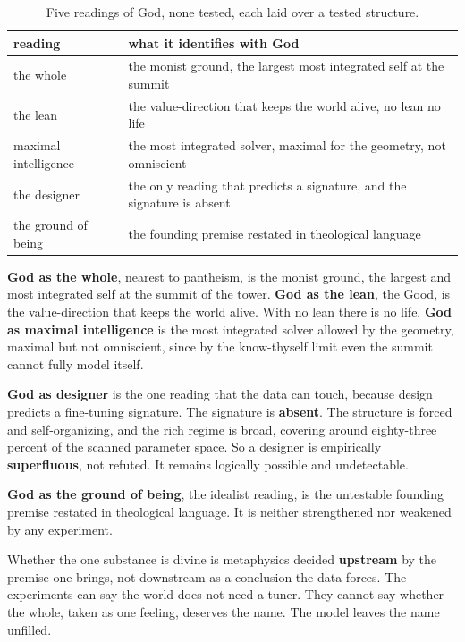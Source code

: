 \begin{table}[ht]
\centering
\begin{tabular}{@{}ll@{}}
\toprule
reading & what it identifies with God \\
\midrule
the whole & the monist ground, the largest most integrated self at the summit \\
the lean & the value-direction that keeps the world alive, no lean no life \\
maximal intelligence & the most integrated solver, maximal for the geometry, not omniscient \\
the designer & the only reading that predicts a signature, and the signature is absent \\
the ground of being & the founding premise restated in theological language \\
\bottomrule
\end{tabular}
\caption{Five readings of God, none tested, each laid over a tested structure.}
\label{tab:god-readings}
\end{table}

\textbf{God as the whole}, nearest to pantheism, is the monist ground, the largest and most integrated self at the summit of the tower. \textbf{God as the lean}, the Good, is the value-direction that keeps the world alive. With no lean there is no life. \textbf{God as maximal intelligence} is the most integrated solver allowed by the geometry, maximal but not omniscient, since by the know-thyself limit even the summit cannot fully model itself.

\textbf{God as designer} is the one reading that the data can touch, because design predicts a fine-tuning signature. The signature is \textbf{absent}. The structure is forced and self-organizing, and the rich regime is broad, covering around eighty-three percent of the scanned parameter space. So a designer is empirically \textbf{superfluous}, not refuted. It remains logically possible and undetectable.

\textbf{God as the ground of being}, the idealist reading, is the untestable founding premise restated in theological language. It is neither strengthened nor weakened by any experiment.

\begin{result}
Whether the one substance is divine is metaphysics decided \textbf{upstream} by the premise one brings, not downstream as a conclusion the data forces. The experiments can say the world does not need a tuner. They cannot say whether the whole, taken as one feeling, deserves the name. The model leaves the name unfilled.
\end{result}

